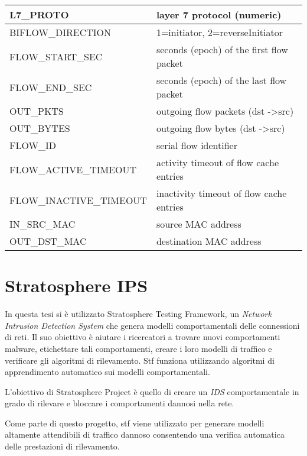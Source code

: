 \documentclass[../main.tex]{subfiles}
\begin{document}
\begin{table}[h]
\begin{tabular}{|l|l|}
L7\_PROTO                            & layer 7 protocol (numeric)                    \\ \hline
BIFLOW\_DIRECTION                    & 1=initiator, 2=reverseInitiator               \\ \hline
FLOW\_START\_SEC                     & seconds (epoch) of the first flow packet      \\ \hline
FLOW\_END\_SEC                       & seconds (epoch) of the last flow packet       \\ \hline
OUT\_PKTS                            & outgoing flow packets (dst -\textgreater src) \\ \hline
OUT\_BYTES                           & outgoing flow bytes (dst -\textgreater src)   \\ \hline
FLOW\_ID                             & serial flow identifier                        \\ \hline
FLOW\_ACTIVE\_TIMEOUT                & activity timeout of flow cache entries        \\ \hline
FLOW\_INACTIVE\_TIMEOUT              & inactivity timeout of flow cache entries      \\ \hline
IN\_SRC\_MAC                         & source MAC address                            \\ \hline
OUT\_DST\_MAC                        & destination MAC address                       \\ \hline
\end{tabular}
\end{table}

\section{Stratosphere IPS}
In questa tesi si è utilizzato Stratosphere Testing Framework, un \textit{Network Intrusion Detection System} che genera modelli comportamentali delle connessioni di reti. Il suo obiettivo è aiutare i ricercatori a trovare nuovi comportamenti malware, etichettare tali comportamenti, creare i loro modelli di traffico e verificare gli algoritmi di rilevamento. Stf funziona utilizzando algoritmi di apprendimento automatico sui modelli comportamentali.

L'obiettivo di Stratosphere Project è quello di creare un \textit{IDS} comportamentale in grado di rilevare e bloccare i comportamenti dannosi nella rete.

Come parte di questo progetto, stf viene utilizzato per generare modelli altamente attendibili di traffico dannoso consentendo una verifica automatica delle prestazioni di rilevamento. \newline
\end{document}
